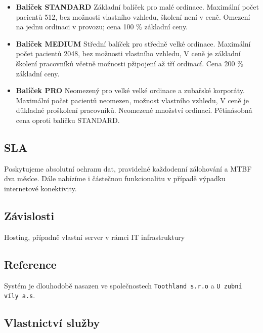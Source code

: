 \documentclass[12pt, a4paper, titlepage]{article}
\begin{document}
	\vspace{1em}	

	\newpage

	\noindent\makebox[\linewidth]{\rule{16cm}{0.4pt}}

	\begin{itemize}		

		\item \textbf{Balíček STANDARD} Základní balíček pro malé ordinace. Maximální počet pacientů 512, bez možnosti vlastního vzhledu, školení není v ceně. Omezení na jednu ordinaci v provozu; cena 100 \% základní ceny.

		\item \textbf{Balíček MEDIUM} Střední balíček pro středně velké ordinace. Maximální počet pacientů 2048, bez možnosti vlastního vzhledu, V ceně je základní školení pracovníků včetně možnosti pžipojení až tří ordinací. Cena 200 \% základní ceny.

		\item \textbf{Balíček PRO} Neomezený pro velké velké ordinace a zubařské korporáty. Maximální počet pacientů neomezen, možnost vlastního vzhledu, V ceně je důkladné proškolení pracovníků. Neomezené množství ordinací. Pětinásobná cena oproti balíčku STANDARD.
	\end{itemize}

	\subsection*{SLA}

	Poskytujeme absolutní ochranu dat, pravidelné každodenní zálohování a MTBF dva měsíce. Dále nabízíme i částečnou funkcionalitu v případě výpadku internetové konektivity.

	\subsection*{Závislosti}

	Hosting, případně vlastní server v rámci IT infrastruktury

	\subsection*{Reference}
	Systém je dlouhodobě nasazen ve společnostech \texttt{Toothland s.r.o} a \texttt{U zubní víly a.s}.

	\subsection*{Vlastnictví služby}
\end{document}

